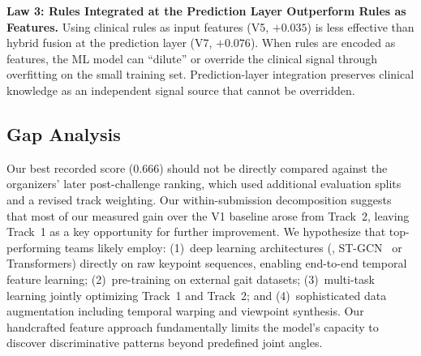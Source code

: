 \noindent\textbf{Law 3: Rules Integrated at the Prediction Layer Outperform Rules as Features.}
Using clinical rules as input features (V5, $+0.035$) is less effective than hybrid fusion at the prediction layer (V7, $+0.076$). When rules are encoded as features, the ML model can ``dilute'' or override the clinical signal through overfitting on the small training set. Prediction-layer integration preserves clinical knowledge as an independent signal source that cannot be overridden.

\subsection{Gap Analysis}
\label{sec:gap}

Our best recorded score (0.666) should not be directly compared against the organizers' later post-challenge ranking, which used additional evaluation splits and a revised track weighting. Our within-submission decomposition suggests that most of our measured gain over the V1 baseline arose from Track~2, leaving Track~1 as a key opportunity for further improvement. We hypothesize that top-performing teams likely employ: (1)~deep learning architectures (\eg, ST-GCN~\cite{yan2018spatial} or Transformers) directly on raw keypoint sequences, enabling end-to-end temporal feature learning; (2)~pre-training on external gait datasets; (3)~multi-task learning jointly optimizing Track~1 and Track~2; and (4)~sophisticated data augmentation including temporal warping and viewpoint synthesis. Our handcrafted feature approach fundamentally limits the model's capacity to discover discriminative patterns beyond predefined joint angles.
